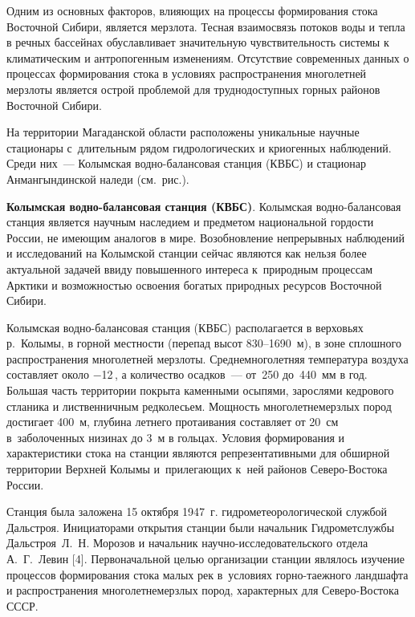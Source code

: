  

\makeProcTitle
{}

Одним из основных факторов, влияющих на процессы формирования стока Восточной Сибири, является мерзлота. Тесная взаимосвязь потоков воды и тепла в речных бассейнах обуславливает значительную чувствительность системы к климатическим и антропогенным изменениям. Отсутствие современных данных о процессах формирования стока в условиях распространения многолетней мерзлоты является острой проблемой для труднодоступных горных районов Восточной Сибири.

На территории Магаданской области расположены уникальные научные стационары с~длительным рядом гидрологических и криогенных наблюдений. Среди них~--- Колымская водно-балансовая станция (КВБС) и стационар Анмангындинской наледи (см.~рис.).



\textbf{Колымская водно-балансовая станция (КВБС)}. Колымская водно-балансовая станция является научным наследием и предметом национальной гордости России, не имеющим аналогов в мире. Возобновление непрерывных наблюдений и исследований на Колымской станции сейчас являются как нельзя более актуальной задачей ввиду повышенного интереса к~природным процессам Арктики и возможностью освоения богатых природных ресурсов Восточной Сибири.

Колымская водно-балансовая станция (КВБС) располагается в верховьях р.~Колымы, в горной местности (перепад высот 830--1690~м), в зоне сплошного распространения многолетней мерзлоты. Среднемноголетняя температура воздуха составляет около $-$12\,, а количество осадков~--- от~250 до~440~мм в год. Большая часть территории покрыта каменными осыпями, зарослями кедрового стланика и лиственничным редколесьем. Мощность многолетнемерзлых пород достигает 400~м, глубина летнего протаивания составляет от 20~см в~заболоченных низинах до 3~м в гольцах. Условия формирования и характеристики стока на станции являются репрезентативными для обширной территории Верхней Колымы и~прилегающих к~ней районов Северо-Востока России.

Станция была заложена 15 октября 1947~г. гидрометеорологической службой Дальстроя. Инициаторами открытия станции были начальник Гидрометслужбы Дальстроя~Л.~Н. Морозов и начальник научно-ис\-сле\-до\-ва\-тель\-ско\-го отдела А.~Г.~Левин [4]. Первоначальной целью организации станции являлось изучение процессов формирования стока малых рек в~условиях горно-таежного ландшафта и распространения многолетнемерзлых пород, характерных для Северо-Востока СССР.

